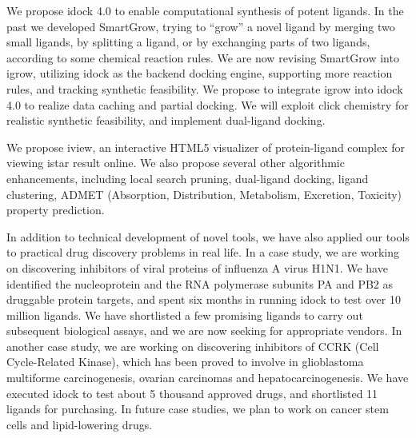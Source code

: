 We propose idock 4.0 to enable computational synthesis of potent ligands. In the past we developed SmartGrow, trying to ``grow'' a novel ligand by merging two small ligands, by splitting a ligand, or by exchanging parts of two ligands, according to some chemical reaction rules. We are now revising SmartGrow into igrow, utilizing idock as the backend docking engine, supporting more reaction rules, and tracking synthetic feasibility. We propose to integrate igrow into idock 4.0 to realize data caching and partial docking. We will exploit click chemistry for realistic synthetic feasibility, and implement dual-ligand docking.

We propose iview, an interactive HTML5 visualizer of protein-ligand complex for viewing istar result online. We also propose several other algorithmic enhancements, including local search pruning, dual-ligand docking, ligand clustering, ADMET (Absorption, Distribution, Metabolism, Excretion, Toxicity) property prediction. 

In addition to technical development of novel tools, we have also applied our tools to practical drug discovery problems in real life. In a case study, we are working on discovering inhibitors of viral proteins of influenza A virus H1N1. We have identified the nucleoprotein and the RNA polymerase subunits PA and PB2 as druggable protein targets, and spent six months in running idock to test over 10 million ligands. We have shortlisted a few promising ligands to carry out subsequent biological assays, and we are now seeking for appropriate vendors. In another case study, we are working on discovering inhibitors of CCRK (Cell Cycle-Related Kinase), which has been proved to involve in glioblastoma multiforme carcinogenesis, ovarian carcinomas and hepatocarcinogenesis. We have executed idock to test about 5 thousand approved drugs, and shortlisted 11 ligands for purchasing. In future case studies, we plan to work on cancer stem cells and lipid-lowering drugs.
